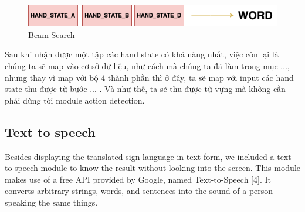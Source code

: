       \begin{figure}[H]
        \centering
        \includegraphics[width=\textwidth]{img/Chap4/Result.png}
        \caption{ Beam Search }
        \label{fig:Chap4-Result }
      \end{figure}

      Sau khi nhận được một tập các hand state có khả năng nhất, việc còn lại là
      chúng ta sẽ map vào cơ sở dữ liệu, như cách mà chúng ta đã làm trong mục ..., 
      nhưng thay vì map với bộ 4 thành phần thì ở đây, ta sẽ map với input các hand state thu được
      từ bước ... .
      Và như thế, ta sẽ thu được từ vựng mà không cần phải dùng tới module action detection.

\subsection{Text to speech}

Besides displaying the translated sign language in text form, we included a text-to-speech module to know the result without looking into the screen. This module makes use of a free API provided by Google, named Text-to-Speech [4]. It converts arbitrary strings, words, and sentences into the sound of a person speaking the same things.
